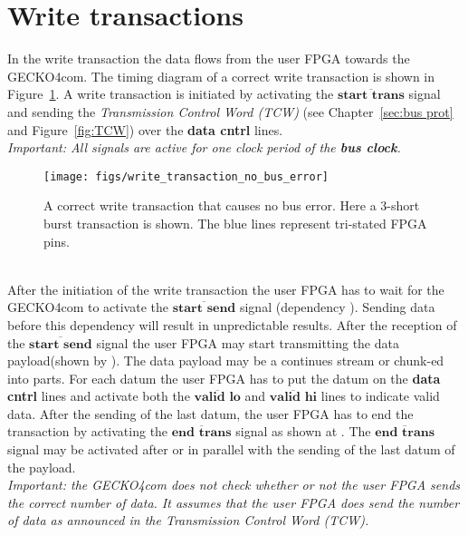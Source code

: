 \section{Write transactions}
In the write transaction the data flows from the user FPGA towards the {\sc
GECKO4com}. The timing diagram of a correct write transaction is shown in
Figure~\ref{fig:write correct}.
A write transaction is initiated by activating the $\overline{\textbf{start
trans}}$ signal and sending the \emph{Transmission Control Word (TCW)} (see
Chapter~\ref{sec:bus prot} and Figure~\ref{fig:TCW}) over the \textbf{data
cntrl} lines.\\
\textit{Important: All signals are active for one clock period of the
\textbf{bus clock}.\important}
\begin{figure}[hb]
\centering%
\texttt{[image: figs/write\_transaction\_no\_bus\_error]}
\caption{A correct write transaction that causes no bus error. Here a 3-short
burst transaction is shown. The blue lines represent tri-stated FPGA pins.}
\label{fig:write correct}
\end{figure}
 \\
After the initiation of the write transaction the user FPGA has to wait for the
{\sc GECKO4com} to activate the $\overline{\textbf{start send}}$ signal
(dependency ). Sending data before this dependency will result in
unpredictable results. After the reception of the $\overline{\textbf{start
send}}$ signal the user FPGA may start transmitting the data payload(shown by
). The data payload may be a continues stream or chunk-ed into parts.
For each datum the user FPGA has to put the datum on the \textbf{data cntrl}
lines and activate both the $\overline{\textbf{valid lo}}$ and
$\overline{\textbf{valid hi}}$ lines to indicate valid data. After the sending
of the last datum, the user FPGA has to end the transaction by activating the
$\overline{\textbf{end trans}}$ signal as shown at . The
$\overline{\textbf{end trans}}$ signal may be activated after or in parallel
with the sending of the last datum of the payload.\\
\textit{Important: the {\sc GECKO4com} does not check whether or not the user
FPGA sends the correct number of data. It assumes that the user FPGA does send
the number of data as announced in the Transmission Control Word (TCW).\important}
